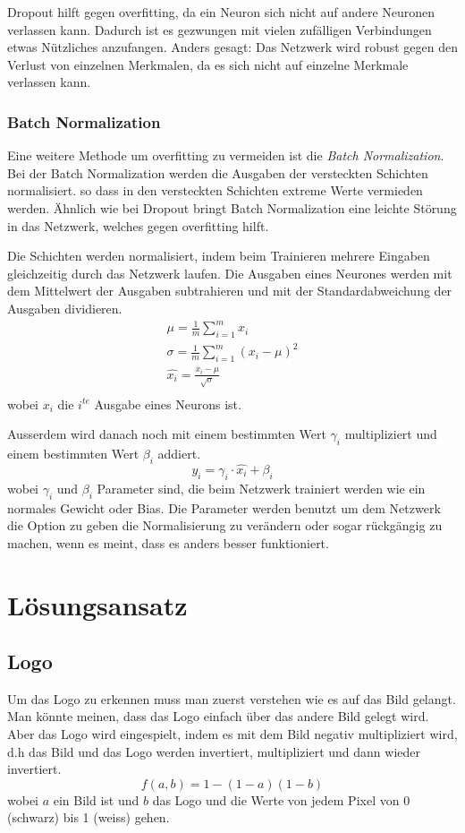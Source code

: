 \documentclass[12pt,a4paper]{report}
\begin{document}
Dropout hilft gegen overfitting,
da ein Neuron sich nicht auf andere Neuronen verlassen kann.
Dadurch ist es gezwungen mit vielen zufälligen Verbindungen etwas Nützliches anzufangen.
Anders gesagt: Das Netzwerk wird robust gegen den Verlust von einzelnen Merkmalen, da es sich nicht auf einzelne Merkmale verlassen kann.

\subsection{Batch Normalization}
Eine weitere Methode um overfitting zu vermeiden ist die \textit{Batch Normalization}.
Bei der Batch Normalization werden die Ausgaben der versteckten Schichten normalisiert\cite{batchnorm}.
so dass in den versteckten Schichten extreme Werte vermieden werden\cite{batchnorm}.
Ähnlich wie bei Dropout bringt Batch Normalization eine leichte Störung in das Netzwerk,
welches gegen overfitting hilft\cite{batchnorm}.

Die Schichten werden normalisiert, indem beim Trainieren mehrere Eingaben gleichzeitig durch das Netzwerk laufen.
Die Ausgaben eines Neurones werden mit dem Mittelwert der Ausgaben subtrahieren und mit der
Standardabweichung der Ausgaben dividieren\cite{batchnorm}.
\begin{gather*}
    \mu = \frac{1}{m}\sum^m_{i=1}x_{i}\\
    \sigma = \frac{1}{m}\sum^m_{i=1}(x_i - \mu)^2\\
    \hat{x_i} = \frac{x_i - \mu}{\sqrt{\sigma}}\\
\end{gather*}
wobei $x_i$ die $i^{te}$ Ausgabe eines Neurons ist.

Ausserdem wird danach noch mit einem bestimmten Wert $\gamma_i$ multipliziert und einem bestimmten Wert $\beta_i$ addiert.
\[y_i = \gamma_i \cdot \hat{x_i} + \beta_i \]
wobei $\gamma_i$ und $\beta_i$ Parameter sind, die beim Netzwerk trainiert werden wie ein normales Gewicht oder Bias\cite{batchnorm}.
Die Parameter werden benutzt um dem Netzwerk die Option zu geben die Normalisierung zu verändern oder sogar rückgängig zu machen, wenn es meint,
dass es anders besser funktioniert\cite{batchnorm_paper}.

\chapter{Lösungsansatz}
\label{ch:lösungsansatz}
\section{Logo}
Um das Logo zu erkennen muss man zuerst verstehen wie es auf das Bild gelangt.
Man könnte meinen, dass das Logo einfach über das andere Bild gelegt wird.
Aber das Logo wird eingespielt, indem es mit dem Bild negativ multipliziert wird,
d.h das Bild und das Logo werden invertiert, multipliziert und dann wieder invertiert\cite{wiki:blend}.
\[f(a,b) = 1 - (1-a)(1-b)\]
wobei $a$ ein Bild ist und $b$ das Logo und die Werte von jedem Pixel von 0 (schwarz) bis 1 (weiss) gehen.
\end{document}

